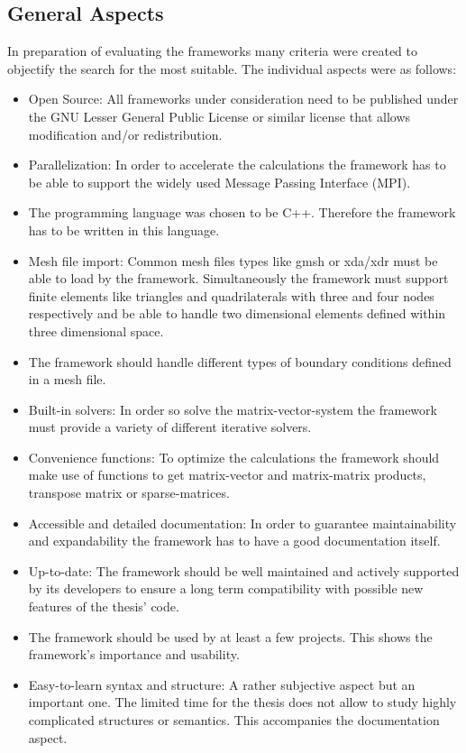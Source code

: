 \documentclass[11pt,twoside]{scrartcl}
\begin{document}
 \subsection{General Aspects}
In preparation of evaluating the frameworks many criteria were created to objectify the search for the most suitable. The individual aspects were as follows:
 \begin{itemize}
 \item Open Source: All frameworks under consideration need to be published under the GNU Lesser General Public License or similar license that allows modification and/or redistribution.
 \item Parallelization: In order to accelerate the calculations the framework has to be able to support the widely used Message Passing Interface (MPI).
 \item The programming language was chosen to be C++. Therefore the framework has to be written in this language.
 \item Mesh file import: Common mesh files types like gmsh or xda/xdr must be able to load by the framework. Simultaneously the framework must support finite elements like triangles and quadrilaterals with three and four nodes respectively and be able to handle two dimensional elements defined within three dimensional space.
 \item The framework should handle different types of boundary conditions defined in a mesh file.
 \item Built-in solvers: In order so solve the matrix-vector-system the framework must provide a variety of different iterative solvers.
 \item Convenience functions: To optimize the calculations the framework should make use of functions to get matrix-vector and matrix-matrix products, transpose matrix or sparse-matrices.
 \item Accessible and detailed documentation: In order to guarantee maintainability and expandability the framework has to have a good documentation itself.
 \item Up-to-date: The framework should be well maintained and actively supported by its developers to ensure a long term compatibility with possible new features of the thesis' code.
 \item The framework should be used by at least a few projects. This shows the framework's importance and usability.
 \item Easy-to-learn syntax and structure: A rather subjective aspect but an important one. The limited time for the thesis does not allow to study highly complicated structures or semantics. This accompanies the documentation aspect.
 \end{itemize}
\end{document}
